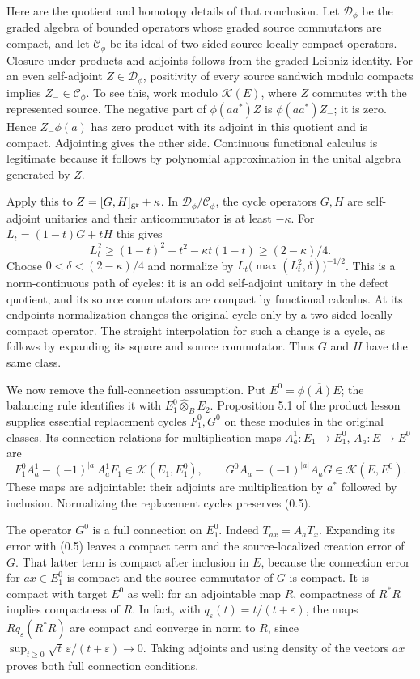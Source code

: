 \documentclass[
  11pt,
]{article}
\begin{document}
Here are the quotient and homotopy details of that conclusion. Let
\(\mathcal D_\phi\) be the graded algebra of bounded operators whose
graded source commutators are compact, and let \(\mathcal C_\phi\) be
its ideal of two-sided source-locally compact operators. Closure under
products and adjoints follows from the graded Leibniz identity. For an
even self-adjoint \(Z\in\mathcal D_\phi\), positivity of every source
sandwich modulo compacts implies \(Z_-\in\mathcal C_\phi\). To see this,
work modulo \(\mathcal K(E)\), where \(Z\) commutes with the represented
source. The negative part of \(\phi(aa^*)Z\) is \(\phi(aa^*)Z_-\); it is
zero. Hence \(Z_-\phi(a)\) has zero product with its adjoint in this
quotient and is compact. Adjointing gives the other side. Continuous
functional calculus is legitimate because it follows by polynomial
approximation in the unital algebra generated by \(Z\).

Apply this to \(Z=[G,H]_{\rm gr}+\kappa\). In
\(\mathcal D_\phi/\mathcal C_\phi\), the cycle operators \(G,H\) are
self-adjoint unitaries and their anticommutator is at least \(-\kappa\).
For \(L_t=(1-t)G+tH\) this gives \[
L_t^2\geq (1-t)^2+t^2-\kappa t(1-t)
\geq(2-\kappa)/4.
\] Choose \(0<\delta<(2-\kappa)/4\) and normalize by
\(L_t\bigl(\max(L_t^2,\delta)\bigr)^{-1/2}\). This is a norm-continuous
path of cycles: it is an odd self-adjoint unitary in the defect
quotient, and its source commutators are compact by functional calculus.
At its endpoints normalization changes the original cycle only by a
two-sided locally compact operator. The straight interpolation for such
a change is a cycle, as follows by expanding its square and source
commutator. Thus \(G\) and \(H\) have the same class.

We now remove the full-connection assumption. Put
\(E^0=\overline{\phi(A)E}\); the balancing rule identifies it with
\(E_1^0\widehat\otimes_B E_2\). Proposition 5.1 of the product lesson
supplies essential replacement cycles \(F_1^0,G^0\) on these modules in
the original classes. Its connection relations for multiplication maps
\(A_a^1:E_1\to E_1^0\), \(A_a:E\to E^0\) are \[
F_1^0A_a^1-(-1)^{|a|}A_a^1F_1\in\mathcal K(E_1,E_1^0),\qquad
G^0A_a-(-1)^{|a|}A_aG\in\mathcal K(E,E^0).
\tag{0.5}
\] These maps are adjointable: their adjoints are multiplication by
\(a^*\) followed by inclusion. Normalizing the replacement cycles
preserves (0.5).

The operator \(G^0\) is a full connection on \(E_1^0\). Indeed
\(T_{ax}=A_aT_x\). Expanding its error with (0.5) leaves a compact term
and the source-localized creation error of \(G\). That latter term is
compact after inclusion in \(E\), because the connection error for
\(ax\in E_1^0\) is compact and the source commutator of \(G\) is
compact. It is compact with target \(E^0\) as well: for an adjointable
map \(R\), compactness of \(R^*R\) implies compactness of \(R\). In
fact, with \(q_\varepsilon(t)=t/(t+\varepsilon)\), the maps
\(Rq_\varepsilon(R^*R)\) are compact and converge in norm to \(R\),
since \(\sup_{t\geq0}\sqrt t\,\varepsilon/(t+\varepsilon)\to0\). Taking
adjoints and using density of the vectors \(ax\) proves both full
connection conditions.
\end{document}

